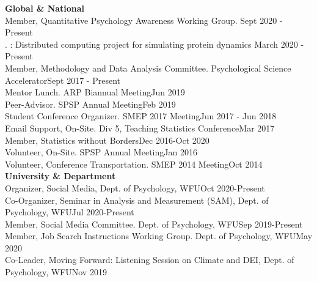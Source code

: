 {\large \textbf{Global \& National}}\smallskip\\
Member, Quantitative Psychology Awareness Working Group. \hfill{Sept 2020 - Present}\smallskip\\
. : Distributed computing project for simulating protein dynamics \hfill{March 2020 - Present}\smallskip\\
Member, Methodology and Data Analysis Committee. Psychological Science Accelerator\hfill{Sept 2017 - Present}\smallskip\\
Mentor Lunch. ARP Biannual Meeting\hfill{Jun 2019}\smallskip\\
Peer-Advisor. SPSP Annual Meeting\hfill{Feb 2019}\smallskip\\
Student Conference Organizer. SMEP 2017 Meeting\hfill{Jun 2017 - Jun 2018}\smallskip\\
Email Support, On-Site. Div 5, Teaching Statistics Conference\hfill{Mar 2017}\smallskip\\
Member, Statistics without Borders\hfill{Dec 2016-Oct 2020}\smallskip\\
Volunteer, On-Site. SPSP Annual Meeting\hfill{Jan 2016}\smallskip\\
Volunteer, Conference Transportation. SMEP 2014 Meeting\hfill{Oct 2014}\medskip\\
%
%
{\large \textbf{University \& Department}}\smallskip\\
Organizer, Social Media, Dept. of Psychology, WFU\hfill {Oct 2020-Present}\smallskip\\
Co-Organizer, Seminar in Analysis and Measurement (SAM), Dept. of Psychology, WFU\hfill {Jul 2020-Present}\smallskip\\
%
Member, Social Media Committee. Dept. of Psychology, WFU\hfill {Sep 2019-Present}\smallskip\\
Member, Job Search Instructions Working Group. Dept. of Psychology, WFU\hfill {May 2020}\smallskip\\
Co-Leader, Moving Forward: Listening Session on Climate and DEI, Dept. of Psychology, WFU\hfill {Nov 2019}\smallskip\\
